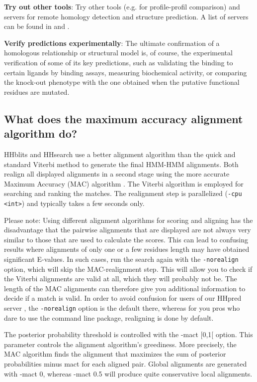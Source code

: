 \documentclass[11pt,a4paper]{article}
\begin{document}
{\bf Try out other tools}:
Try other tools (e.g. for profile-profil comparison) and servers for remote homology detection and structure prediction. 
A list of servers can be found in \cite{Mariani:2011} and \cite{Battey:2007}.

{\bf Verify predictions experimentally}: 
The ultimate confirmation of a homologous relationship or structural model is, of course, the experimental verification of some of its key predictions, such as validating the binding to certain ligands by binding assays, measuring biochemical activity, or comparing the knock-out phenotype with the one obtained when the putative functional residues are mutated.


\subsection{What does the maximum accuracy alignment algorithm do?} \label{MAC}
HHblits and HHsearch use a better alignment algorithm than the quick and 
standard Viterbi method to generate the final HMM-HMM alignments. Both realign
all displayed alignments in a second stage using the more accurate Maximum Accuracy 
(MAC) algorithm \cite{Durbin:2008,Biegert:2008}. The Viterbi algorithm is employed 
for searching and ranking the matches. The realignment step is parallelized 
(\verb`-cpu <int>`) and typically takes a few seconds only.    

Please note: Using different alignment algorithms for scoring and aligning has the 
disadvantage that the pairwise alignments that are displayed are not always very similar to 
those that are used to calculate the scores. This can lead to confusing results 
where alignments of only one or a few residues length may have obtained significant
E-values. In such cases, run the search again with the \verb`-norealign` option, which will 
skip the MAC-realignment step. This will allow you to check if the Viterbi alignments 
are valid at all, which they will probably not be. The length of the MAC alignments 
can therefore give you additional information to decide if a match is valid. In order
to avoid confusion for users of our HHpred server \cite{Soding:2005b, Hildebrand:2009}, 
the \verb`-norealign` option is the default there, whereas for you pros who dare to use 
the command line package, realigning is done by default.

The posterior probability threshold is controlled with the -mact [0,1[ option. 
This parameter controls the alignment algorithm's greediness. More precisely, the 
MAC algorithm finds the alignment that maximizes the sum of posterior probabilities 
minus mact for each aligned pair. Global alignments are generated with -mact 0, 
whereas -mact 0.5 will produce quite conservative local alignments. 
\end{document}
